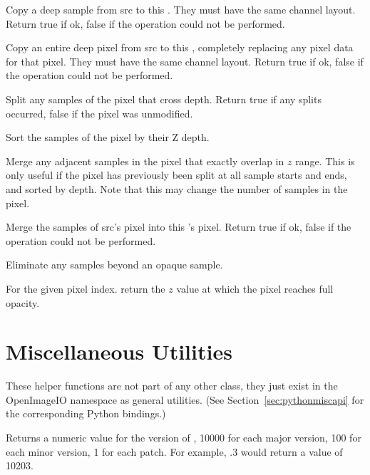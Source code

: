 Copy a deep sample from {\cf src} to this \DeepData. They must have the same
channel layout. Return {\cf true} if ok, {\cf false} if the operation could
not be performed.
\apiend

Copy an entire deep pixel from {\cf src} to this \DeepData, completely
replacing any pixel data for that pixel. They must have the same channel
layout. Return {\cf true} if ok, {\cf false} if the operation could not be
performed.
\apiend

Split any samples of the pixel that cross {\cf depth}. Return {\cf true} if
any splits occurred, {\cf false} if the pixel was unmodified.
\apiend

Sort the samples of the pixel by their Z depth.
\apiend

Merge any adjacent samples in the pixel that exactly overlap in $z$
range. This is only useful if the pixel has previously been split at
all sample starts and ends, and sorted by depth. Note that this may change
the number of samples in the pixel.
\apiend

Merge the samples of {\cf src}'s pixel into this \DeepData's pixel.
Return {\cf true} if ok, {\cf false} if the operation could not be
performed.
\apiend

Eliminate any samples beyond an opaque sample.
\apiend

For the given pixel index. return the $z$ value at which the pixel reaches
full opacity.
\apiend


\section{Miscellaneous Utilities}
\label{sec:miscapi}

These helper functions are not part of any other \OpenImageIO class,
they just exist in the {\cf OpenImageIO} namespace as general utilities.
(See Section~\ref{sec:pythonmiscapi} for the corresponding Python
bindings.)

Returns a numeric value for the version of \product, 10000 for each
major version, 100 for each minor version, 1 for each patch.  For
example, .3 would return a value of 10203.
\apiend

